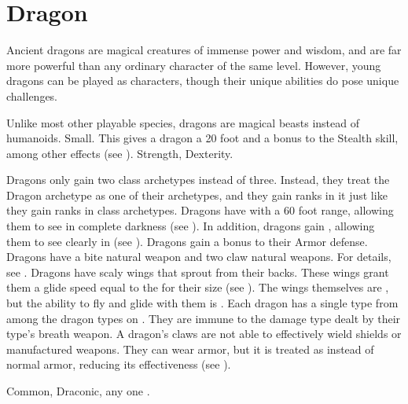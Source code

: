 \section{Dragon}
Ancient dragons are magical creatures of immense power and wisdom, and are far more powerful than any ordinary character of the same level.
However, young dragons can be played as characters, though their unique abilities do pose unique challenges.

 Unlike most other playable species, dragons are magical beasts instead of humanoids.
 Small. This gives a dragon a 20 foot  and a  bonus to the Stealth skill, among other effects (see ).
  Strength,  Dexterity.
\begin{itemize}
	 Dragons only gain two class archetypes instead of three.
	      Instead, they treat the Dragon archetype as one of their archetypes, and they gain ranks in it just like they gain ranks in class archetypes.
	 Dragons have  with a 60 foot range, allowing them to see in complete darkness (see ).
	      In addition, dragons gain , allowing them to see clearly in  (see ).
	 Dragons gain a  bonus to their Armor defense.
	 Dragons have a bite natural weapon and two claw natural weapons.
	      For details, see .
	 Dragons have scaly wings that sprout from their backs.
	      These wings grant them a glide speed equal to the  for their size (see ).
	      The wings themselves are , but the ability to fly and glide with them is \magical.
	 Each dragon has a single type from among the dragon types on .
	      They are immune to the damage type dealt by their type's breath weapon.
	 A dragon's claws are not able to effectively wield shields or manufactured weapons.
	      They can wear armor, but it is treated as  instead of normal armor, reducing its effectiveness (see ).
\end{itemize}
 Common, Draconic, any one .

